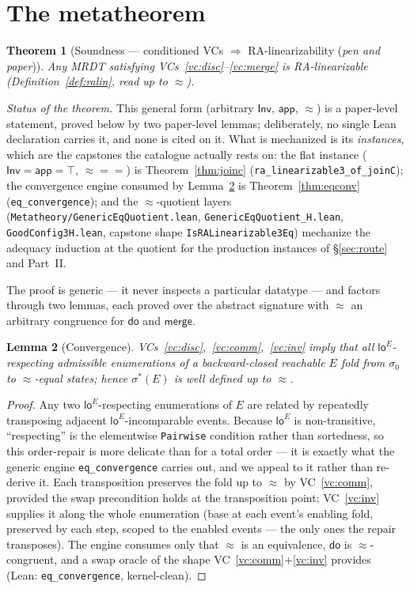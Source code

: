 \documentclass[11pt]{article}
\newtheorem{theorem}{Theorem}[section]
\newtheorem{lemma}[theorem]{Lemma}
\newcommand{\loE}[1]{\mathsf{lo}^{#1}}
\newcommand{\lean}[1]{\texttt{#1}}
\newcommand{\st}{\sigma}
\newcommand{\ini}{\st_0}
\newcommand{\dodo}{\mathsf{do}}
\newcommand{\merge}{\mathsf{merge}}
\newcommand{\eqobs}{\approx}
\newcommand{\Inv}{\mathsf{Inv}}
\newcommand{\app}{\mathsf{app}}
\newcommand{\sigmacan}{\st^{\ast}}
\begin{document}
\section{The metatheorem}\label{sec:meta}

\begin{theorem}[Soundness --- conditioned VCs $\Rightarrow$ RA-linearizability
(\emph{pen and paper})]\label{thm:meta}
Any MRDT satisfying VCs~\ref{vc:disc}--\ref{vc:merge} is RA-linearizable
(Definition~\ref{def:ralin}, read up to $\eqobs$).
\end{theorem}

\emph{Status of the theorem.} This general form (arbitrary $\Inv$, $\app$, $\eqobs$)
is a paper-level statement, proved below by two paper-level lemmas; deliberately, no
single Lean declaration carries it, and none is cited on it. What is mechanized is its
\emph{instances}, which are the capstones the catalogue actually rests on: the flat
instance ($\Inv = \app = \top$, ${\eqobs} = {=}$) is Theorem~\ref{thm:joinc}
(\lean{ra\_linearizable3\_of\_joinC}); the convergence engine consumed by
Lemma~\ref{lem:conv} is Theorem~\ref{thm:eqconv} (\lean{eq\_convergence}); and the
$\eqobs$-quotient layers (\lean{Metatheory/GenericEqQuotient.lean},
\lean{GenericEqQuotient\_H.lean}, \lean{GoodConfig3H.lean}, capstone shape
\lean{IsRALinearizable3Eq}) mechanize the adequacy induction at the quotient for the
production instances of \S\ref{sec:route} and Part~II.

The proof is generic --- it never inspects a particular datatype --- and factors through two
lemmas, each proved over the abstract signature with $\eqobs$ an arbitrary congruence for
$\dodo$ and $\merge$.

\begin{lemma}[Convergence]\label{lem:conv}
VCs~\ref{vc:disc},~\ref{vc:comm},~\ref{vc:inv} imply that all $\loE{E}$-respecting admissible
enumerations of a backward-closed reachable $E$ fold from $\ini$ to $\eqobs$-equal states;
hence $\sigmacan(E)$ is well defined up to $\eqobs$.
\end{lemma}
\begin{proof}
Any two $\loE{E}$-respecting enumerations of $E$ are related by repeatedly transposing adjacent
$\loE{E}$-incomparable events. Because $\loE{E}$ is non-transitive, ``respecting'' is the elementwise
\lean{Pairwise} condition rather than sortedness, so this order-repair is more delicate than
for a total order --- it is exactly what the generic engine \lean{eq\_convergence} carries out,
and we appeal to it rather than re-derive it. Each transposition preserves the fold up to
$\eqobs$ by VC~\ref{vc:comm}, provided the swap precondition holds at the transposition point;
VC~\ref{vc:inv} supplies it along the whole enumeration (base at each event's enabling fold,
preserved by each step, scoped to the enabled events --- the only ones the repair transposes).
The engine consumes only that $\eqobs$ is an equivalence, $\dodo$ is $\eqobs$-congruent, and a
swap oracle of the shape VC~\ref{vc:comm}$+$\ref{vc:inv} provides (Lean: \lean{eq\_convergence},
kernel-clean).
\end{proof}
\end{document}
